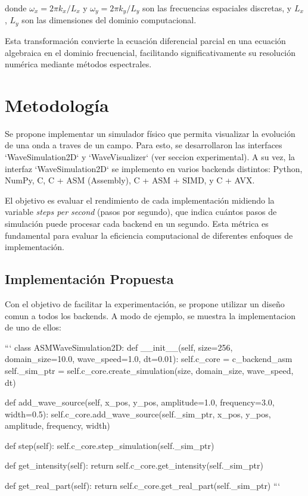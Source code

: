 \documentclass[a4paper]{article}
\begin{document}
donde $\omega_x = 2\pi k_x/L_x$ y $\omega_y = 2\pi k_y/L_y$ son las frecuencias espaciales discretas, y $L_x$, $L_y$ son las
dimensiones del dominio computacional.

Esta transformación convierte la ecuación diferencial parcial en una ecuación algebraica en el dominio frecuencial, facilitando
significativamente su resolución numérica mediante métodos espectrales.

\section{Metodología}
Se propone implementar un simulador físico que permita visualizar la evolución de una onda a traves de un campo. Para esto, se desarrollaron
las interfaces `WaveSimulation2D` y `WaveVisualizer` (ver seccion experimental). A su vez, la interfaz `WaveSimulation2D` se implemento en varios
backends distintos: Python, NumPy, C, C + ASM (Assembly), C + ASM + SIMD, y C + AVX.

El objetivo es evaluar el rendimiento de cada implementación midiendo la variable \textit{steps per second} (pasos por segundo), que
indica cuántos pasos de simulación puede procesar cada backend en un segundo. Esta métrica es fundamental para evaluar la eficiencia
computacional de diferentes enfoques de implementación.

\subsection{Implementación Propuesta}
Con el objetivo de facilitar la experimentación, se propone utilizar un diseño comun a todos los backends. A modo de ejemplo, se muestra
la implementacion de uno de ellos:

```
class ASMWaveSimulation2D:
def __init__(self, size=256, domain_size=10.0, wave_speed=1.0, dt=0.01):
self.c_core = c_backend_asm
self._sim_ptr = self.c_core.create_simulation(size, domain_size, wave_speed, dt)

def add_wave_source(self, x_pos, y_pos, amplitude=1.0, frequency=3.0, width=0.5):
self.c_core.add_wave_source(self._sim_ptr, x_pos, y_pos, amplitude, frequency, width)

def step(self):
self.c_core.step_simulation(self._sim_ptr)

def get_intensity(self):
return self.c_core.get_intensity(self._sim_ptr)

def get_real_part(self):
return self.c_core.get_real_part(self._sim_ptr)
```
\end{document}
